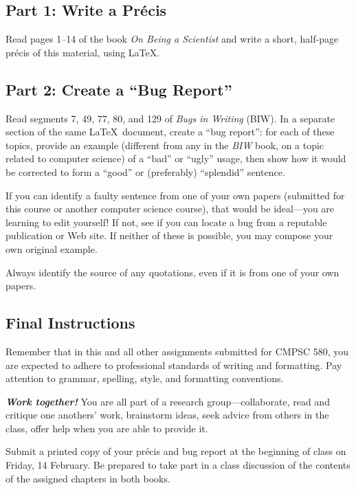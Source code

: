 
\usepackage[compact]{titlesec}




\subsection*{Part 1: Write a Pr\'{e}cis}
Read pages 1--14 of the book {\em On Being a Scientist} and write a short,
half-page pr\'{e}cis of this material, using \LaTeX.

\subsection*{Part 2: Create a ``Bug Report''}
Read segments 7, 49, 77, 80, and 129 of {\em Bugs in Writing} (BIW). 
In a separate section of the same \LaTeX\ document, create a
``bug report'': for each
of these topics, provide an example (different from any in the {\em BIW}
book, on a topic
related to computer science) of a ``bad'' or ``ugly'' usage, then show
how it would be corrected to form a ``good'' or (preferably) ``splendid''
sentence.

If you can identify a faulty sentence from one of your own papers (submitted
for this course or another computer science course), that would be ideal---you
    are learning to edit yourself!
If not, see if you can locate a bug from a reputable publication or
Web site. If neither of these is possible, you may compose your own
original example.

Always identify the source of any quotations, even if it is from one of your
own papers.

\subsection*{Final Instructions}
Remember that in this and all other assignments submitted for CMPSC 580,
you are expected to adhere to professional standards of writing and
formatting. Pay attention to grammar, spelling, style, and formatting
conventions.

{\large\color{blue}\textbf{\textit{Work together!}}} You are all part of a research group---collaborate,
read and critique one anothers' work, brainstorm ideas,
seek advice from others in the class, offer help when you are able 
to provide it.

Submit a printed copy of your pr\'{e}cis and bug report at the beginning 
of class on Friday, 14 February. Be prepared to take part in a
class discussion of the contents of the assigned chapters in both books.

